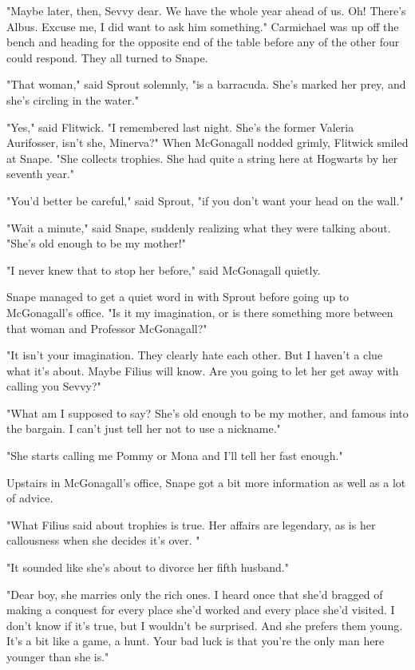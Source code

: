 \documentclass[a4paper,11pt]{article}
\begin{document}
"Maybe later, then, Sevvy dear. We have the whole year ahead of us. Oh! There's Albus. Excuse me, I did want to ask him something." Carmichael was up off the bench and heading for the opposite end of the table before any of the other four could respond. They all turned to Snape.

"That woman," said Sprout solemnly, "is a barracuda. She's marked her prey, and she's circling in the water."

"Yes," said Flitwick. "I remembered last night. She's the former Valeria Aurifosser, isn't she, Minerva?" When McGonagall nodded grimly, Flitwick smiled at Snape. "She collects trophies. She had quite a string here at Hogwarts by her seventh year."

"You'd better be careful," said Sprout, "if you don't want your head on the wall."

"Wait a minute," said Snape, suddenly realizing what they were talking about. "She's old enough to be my mother!"

"I never knew that to stop her before," said McGonagall quietly.

Snape managed to get a quiet word in with Sprout before going up to McGonagall's office. "Is it my imagination, or is there something more between that woman and Professor McGonagall?"

"It isn't your imagination. They clearly hate each other. But I haven't a clue what it's about. Maybe Filius will know. Are you going to let her get away with calling you Sevvy?"

"What am I supposed to say? She's old enough to be my mother, and famous into the bargain. I can't just tell her not to use a nickname."

"She starts calling me Pommy or Mona and I'll tell her fast enough."

Upstairs in McGonagall's office, Snape got a bit more information as well as a lot of advice.

"What Filius said about trophies is true. Her affairs are legendary, as is her callousness when she decides it's over. "

"It sounded like she's about to divorce her fifth husband."

"Dear boy, she marries only the rich ones. I heard once that she'd bragged of making a conquest for every place she'd worked and every place she'd visited. I don't know if it's true, but I wouldn't be surprised. And she prefers them young. It's a bit like a game, a hunt. Your bad luck is that you're the only man here younger than she is."
\end{document}
